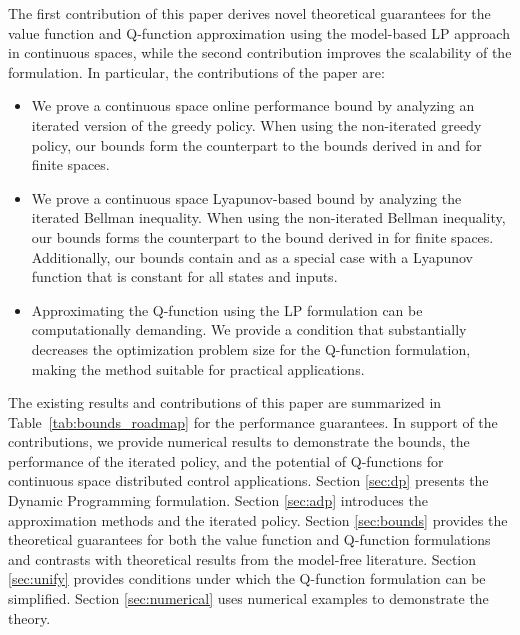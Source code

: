 \documentclass[journal]{IEEEtran}
\newcommand{\textQ}{Q}
\begin{document}
The first contribution of this paper derives novel theoretical guarantees for the value function and \textQ-function approximation using the model-based LP approach in continuous spaces, while the second contribution improves the scalability of the formulation. In particular, the contributions of the paper are:
\begin{itemize}
\item We prove a continuous space online performance bound by analyzing an iterated version of the greedy policy.
When using the non-iterated greedy policy, our bounds form the counterpart to the bounds derived in \cite[Theorem 1]{vanRoy_linApproxDP} and \cite[Theorem 1]{vanroy_decentADP} for finite spaces.
	
\item We prove a continuous space Lyapunov-based bound by analyzing the iterated Bellman inequality.
When using the non-iterated Bellman inequality, our bounds forms the counterpart to the bound derived in \cite[Theorem 3]{vanRoy_linApproxDP} for finite spaces.
Additionally, our bounds contain \cite[\S 4.2]{boyd_iteratedBellman} and \cite[Theorem 4.1]{beuchat_2016_ECC_PWMQ} as a special case with a Lyapunov function that is constant for all states and inputs.
	
\item Approximating the \textQ-function using the LP formulation can be computationally demanding. We provide a condition that substantially decreases the optimization problem size for the \textQ-function formulation, making the method suitable for practical applications.
\end{itemize}


The existing results and contributions of this paper are summarized in Table~\ref{tab:bounds_roadmap} for the performance guarantees.
In support of the contributions, we provide numerical results to demonstrate the bounds, the performance of the iterated policy, and the potential of \textQ-functions for continuous space distributed control applications.
Section \ref{sec:dp} presents the Dynamic Programming formulation.
Section \ref{sec:adp} introduces the approximation methods and the iterated policy.
Section \ref{sec:bounds} provides the theoretical guarantees for both the value function and \textQ-function formulations and contrasts with theoretical results from the model-free literature.
Section \ref{sec:unify} provides conditions under which the \textQ-function formulation can be simplified.
Section \ref{sec:numerical} uses numerical examples to demonstrate the theory.
\end{document}
